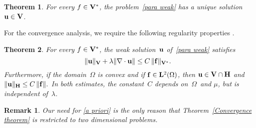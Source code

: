 \documentclass[11pt]{article}
\newcommand{\vf}{{\bf f}}
\newcommand{\vu}{{\bf u}}
\newcommand{\vv}{{\bf v}}
\newcommand{\vV}{{\bf V}}
\numberwithin{equation}{section}
\newtheorem{theorem}{Theorem}[section]
\newtheorem{remark}{Remark}[section]
\begin{document}
\begin{theorem}\label{thm: unique solution}
For every $f \in \vV^*$, the problem~\eqref{para weak} has a unique solution~$\vu\in\vV$. 
\end{theorem}

For the convergence analysis, we require the following regularity properties \cite[Lemma~2.2]{BrennerSung1992}. 
\begin{theorem}\label{lem: vu bound}
For every $f \in \vV^*$, the weak solution~$\vu$ of~\eqref{para weak} satisfies 
\begin{equation}\label{a priori}
  \|\vu\|_{\vV} + \lambda \|\nabla \cdot \vu\| \le C\,  \|\vf\|_{\vV^*}.
\end{equation}
Furthermore, if the domain~$\Omega$ is convex and if $\vf \in {\bf L}^2(\Omega)$, then 
$\vu \in \vV \cap {\bf H}$ and $\|\vu\|_{\bf H} \le  C\,\|\vf\|.$
In both estimates, the constant~$C$ depends on~$\Omega$~and $\mu$, but is independent of~$\lambda$.
\end{theorem}

\begin{remark}
Our need for \eqref{a priori}  is the only reason that Theorem~\ref{Convergence theorem} is restricted to two dimensional problems.  
\end{remark}
\end{document}
